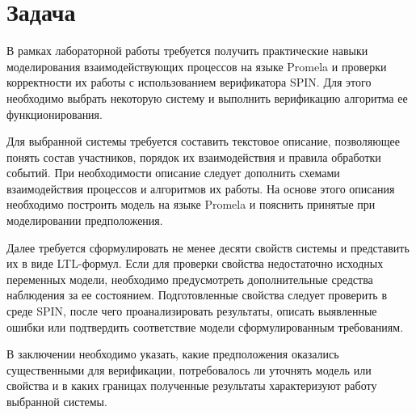 \section{Задача}

В рамках лабораторной работы требуется получить практические навыки
моделирования взаимодействующих процессов на языке Promela и проверки
корректности их работы с использованием верификатора SPIN. Для этого
необходимо выбрать некоторую систему и выполнить верификацию алгоритма
ее функционирования.

Для выбранной системы требуется составить текстовое описание, позволяющее
понять состав участников, порядок их взаимодействия и правила обработки
событий. При необходимости описание следует дополнить схемами взаимодействия
процессов и алгоритмов их работы. На основе этого описания необходимо
построить модель на языке Promela и пояснить принятые при моделировании
предположения.

Далее требуется сформулировать не менее десяти свойств системы и представить
их в виде LTL-формул. Если для проверки свойства недостаточно исходных
переменных модели, необходимо предусмотреть дополнительные средства
наблюдения за ее состоянием. Подготовленные свойства следует проверить
в среде SPIN, после чего проанализировать результаты, описать выявленные
ошибки или подтвердить соответствие модели сформулированным требованиям.

В заключении необходимо указать, какие предположения оказались существенными
для верификации, потребовалось ли уточнять модель или свойства и в каких
границах полученные результаты характеризуют работу выбранной системы.
